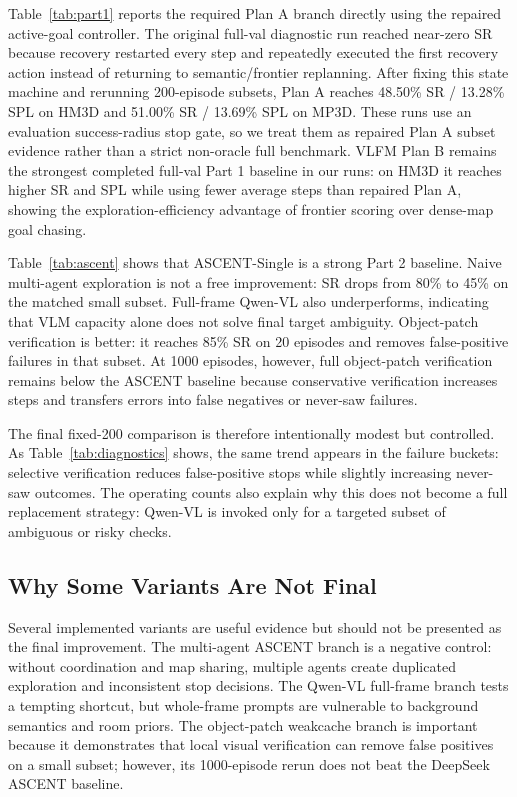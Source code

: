 \documentclass[10pt,twocolumn,letterpaper]{article}
\begin{document}
Table~\ref{tab:part1} reports the required Plan A branch directly using the repaired active-goal controller. The original full-val diagnostic run reached near-zero SR because recovery restarted every step and repeatedly executed the first recovery action instead of returning to semantic/frontier replanning. After fixing this state machine and rerunning 200-episode subsets, Plan A reaches 48.50\% SR / 13.28\% SPL on HM3D and 51.00\% SR / 13.69\% SPL on MP3D. These runs use an evaluation success-radius stop gate, so we treat them as repaired Plan A subset evidence rather than a strict non-oracle full benchmark. VLFM Plan B remains the strongest completed full-val Part 1 baseline in our runs: on HM3D it reaches higher SR and SPL while using fewer average steps than repaired Plan A, showing the exploration-efficiency advantage of frontier scoring over dense-map goal chasing.

Table~\ref{tab:ascent} shows that ASCENT-Single is a strong Part 2 baseline. Naive multi-agent exploration is not a free improvement: SR drops from 80\% to 45\% on the matched small subset. Full-frame Qwen-VL also underperforms, indicating that VLM capacity alone does not solve final target ambiguity. Object-patch verification is better: it reaches 85\% SR on 20 episodes and removes false-positive failures in that subset. At 1000 episodes, however, full object-patch verification remains below the ASCENT baseline because conservative verification increases steps and transfers errors into false negatives or never-saw failures.

The final fixed-200 comparison is therefore intentionally modest but controlled. As Table~\ref{tab:diagnostics} shows, the same trend appears in the failure buckets: selective verification reduces false-positive stops while slightly increasing never-saw outcomes. The operating counts also explain why this does not become a full replacement strategy: Qwen-VL is invoked only for a targeted subset of ambiguous or risky checks.

\subsection{Why Some Variants Are Not Final}
Several implemented variants are useful evidence but should not be presented as the final improvement. The multi-agent ASCENT branch is a negative control: without coordination and map sharing, multiple agents create duplicated exploration and inconsistent stop decisions. The Qwen-VL full-frame branch tests a tempting shortcut, but whole-frame prompts are vulnerable to background semantics and room priors. The object-patch weakcache branch is important because it demonstrates that local visual verification can remove false positives on a small subset; however, its 1000-episode rerun does not beat the DeepSeek ASCENT baseline.
\end{document}
